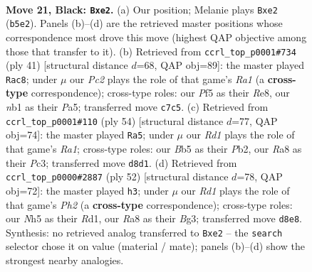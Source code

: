 \documentclass[11pt]{article}
\begin{document}
\clearpage

\begin{figure}[p]\centering
\begin{subfigure}{0.46\textwidth}\centering
\resizebox{\linewidth}{!}{%
\newchessgame
\chessboard[
  setfen={r2r2k1/P1p3bp/1p4p1/1b3p1n/4pP1P/R5PB/4P3/1NB1R1K1 b - - 3 21},
  showmover=false,
  pgfstyle=straightmove, color=movearrow, markmove={b5-e2}
]}
\caption{}
\end{subfigure}\hfill
\begin{subfigure}{0.46\textwidth}\centering
\resizebox{\linewidth}{!}{%
\newchessgame
\chessboard[
  setfen={r3r1k1/1p3pb1/3p2p1/p2B1n1p/P2P3P/1P4P1/1BR2P2/5RK1 b - - 0 21},
  showmover=false,
  pgfstyle=straightmove, color=movearrow, markmove={a8-c8}
]}
\caption{}
\end{subfigure}
\\[4pt]
\begin{subfigure}{0.46\textwidth}\centering
\resizebox{\linewidth}{!}{%
\newchessgame
\chessboard[
  setfen={1rr3k1/4bp2/4p3/6pn/1p1BR2p/2P2N1P/1P3PP1/R5K1 w - - 0 28},
  showmover=false,
  pgfstyle=straightmove, color=movearrow, markmove={a1-a5}
]}
\caption{}
\end{subfigure}\hfill
\begin{subfigure}{0.46\textwidth}\centering
\resizebox{\linewidth}{!}{%
\newchessgame
\chessboard[
  setfen={4r3/1pp2k2/p2b4/P3prpp/4R3/2P2PB1/1P4PP/2KR4 w - - 0 27},
  showmover=false,
  pgfstyle=straightmove, color=movearrow, markmove={h2-h3}
]}
\caption{}
\end{subfigure}
\caption{\textbf{Move 21, Black: \texttt{Bxe2}.} (a) Our position; Melanie plays \texttt{Bxe2} (\texttt{b5e2}). Panels (b)--(d) are the retrieved master positions whose correspondence most drove this move (highest QAP objective among those that transfer to it). (b) Retrieved from \texttt{ccrl\_top\_p0001\#734} (ply 41) [structural distance $d$=68, QAP obj=89]: the master played \texttt{Rac8}; under $\mu$ our \emph{Pc2} plays the role of that game's \emph{Ra1} (a \textbf{cross-type} correspondence); cross-type roles: our \emph{P}f5 as their \emph{R}e8, our \emph{n}b1 as their \emph{P}a5; transferred move \texttt{c7c5}. (c) Retrieved from \texttt{ccrl\_top\_p0001\#110} (ply 54) [structural distance $d$=77, QAP obj=74]: the master played \texttt{Ra5}; under $\mu$ our \emph{Rd1} plays the role of that game's \emph{Ra1}; cross-type roles: our \emph{B}b5 as their \emph{P}b2, our \emph{R}a8 as their \emph{P}c3; transferred move \texttt{d8d1}. (d) Retrieved from \texttt{ccrl\_top\_p0000\#2887} (ply 52) [structural distance $d$=78, QAP obj=72]: the master played \texttt{h3}; under $\mu$ our \emph{Rd1} plays the role of that game's \emph{Ph2} (a \textbf{cross-type} correspondence); cross-type roles: our \emph{N}h5 as their \emph{R}d1, our \emph{R}a8 as their \emph{B}g3; transferred move \texttt{d8e8}. Synthesis: no retrieved analog transferred to \texttt{Bxe2} -- the \texttt{search} selector chose it on value (material / mate); panels (b)--(d) show the strongest nearby analogies.}
\label{fig:thought-m41}
\end{figure}
\end{document}
